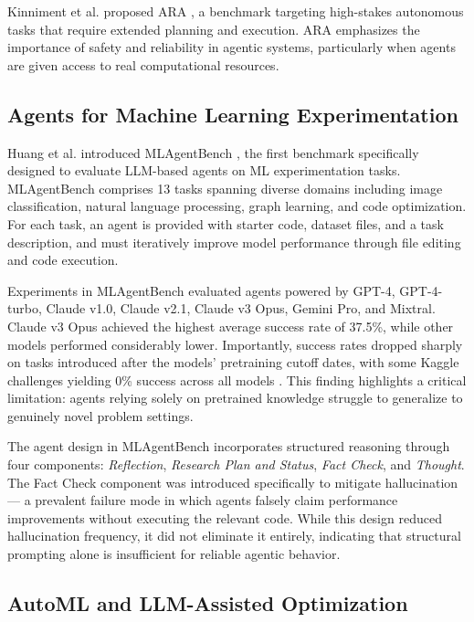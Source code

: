 \documentclass[conference]{IEEEtran}
\begin{document}
Kinniment et al. proposed ARA \cite{kinniment2023ara}, a benchmark targeting
high-stakes autonomous tasks that require extended planning and execution. ARA
emphasizes the importance of safety and reliability in agentic systems,
particularly when agents are given access to real computational resources.

\subsection{Agents for Machine Learning Experimentation}

Huang et al. introduced MLAgentBench \cite{huang2024mlagentbench}, the first
benchmark specifically designed to evaluate LLM-based agents on ML
experimentation tasks. MLAgentBench comprises 13 tasks spanning diverse domains
including image classification, natural language processing, graph learning, and
code optimization. For each task, an agent is provided with starter code,
dataset files, and a task description, and must iteratively improve model
performance through file editing and code execution.

Experiments in MLAgentBench evaluated agents powered by GPT-4, GPT-4-turbo,
Claude v1.0, Claude v2.1, Claude v3 Opus, Gemini Pro, and Mixtral. Claude v3
Opus achieved the highest average success rate of 37.5\%, while other models
performed considerably lower. Importantly, success rates dropped sharply on
tasks introduced after the models' pretraining cutoff dates, with some Kaggle
challenges yielding 0\% success across all models \cite{huang2024mlagentbench}.
This finding highlights a critical limitation: agents relying solely on
pretrained knowledge struggle to generalize to genuinely novel problem settings.

The agent design in MLAgentBench incorporates structured reasoning through four
components: \textit{Reflection}, \textit{Research Plan and Status},
\textit{Fact Check}, and \textit{Thought}. The Fact Check component was
introduced specifically to mitigate hallucination --- a prevalent failure mode
in which agents falsely claim performance improvements without executing the
relevant code. While this design reduced hallucination frequency, it did not
eliminate it entirely, indicating that structural prompting alone is insufficient
for reliable agentic behavior.

\subsection{AutoML and LLM-Assisted Optimization}
\end{document}

